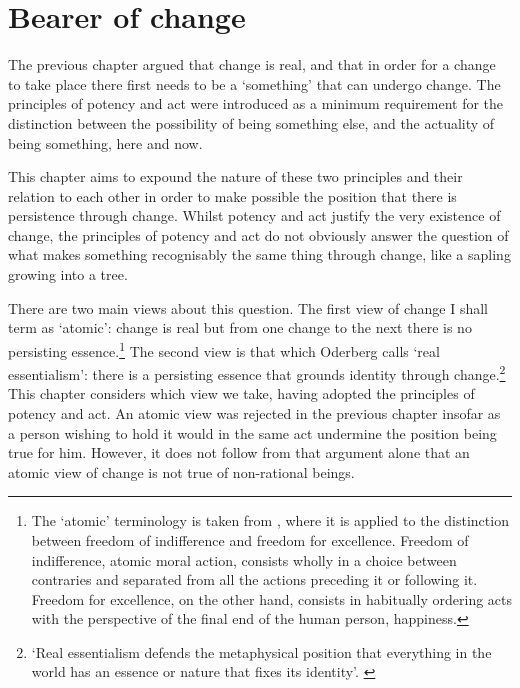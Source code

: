 
\chapter{Bearer of change}
\label{ch:permanence}

The previous chapter argued that change is real, and that in order for a change to take place there first needs to be a `something' that can undergo change. The principles of potency and act were introduced as a minimum requirement for the distinction between the possibility of being something else, and the actuality of being something, here and now.

This chapter aims to expound the nature of these two principles and their relation to each other in order to make possible the position that there is persistence through change. Whilst potency and act justify the very existence of change, the principles of potency and act do not obviously answer the question of what makes something recognisably the same thing through change, like a sapling growing into a tree.

There are two main views about this question. The first view of change I shall term as `atomic': change is real but from one change to the next there is no persisting essence.\footnote{The `atomic' terminology is taken from \textcite[][336]{pinckaers1995sources}, where it is applied to the distinction between freedom of indifference and freedom for excellence. Freedom of indifference, atomic moral action, consists wholly in a choice between contraries and separated from all the actions preceding it or following it. Freedom for excellence, on the other hand, consists in habitually ordering acts with the perspective of the final end of the human person, happiness.} The second view is that which Oderberg calls `real essentialism': there is a persisting essence that grounds identity through change.\footnote{`Real essentialism defends the metaphysical position that everything in the world has an essence or nature that fixes its identity'. \parencite[][]{Oderberg2007-ODERE-2}} This chapter considers which view we take, having adopted the principles of potency and act. An atomic view was rejected in the previous chapter insofar as a person wishing to hold it would in the same act undermine the position being true for him. However, it does not follow from that argument alone that an atomic view of change is not true of non-rational beings.

